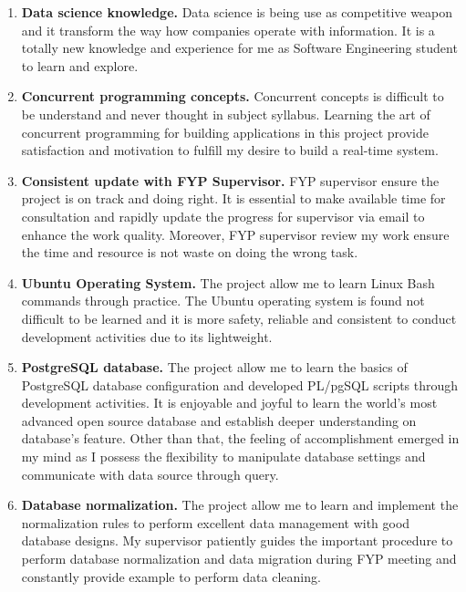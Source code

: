 \begin{enumerate}[topsep=0pt,itemsep=-1ex,partopsep=1ex,parsep=1.5ex]
	\item \textbf{Data science knowledge.} Data science is being use as competitive weapon and it transform the way how companies operate with information. It is a totally new knowledge and experience for me as Software Engineering student to learn and explore.
	
	\item \textbf{Concurrent programming concepts.} Concurrent concepts is difficult to be understand and never thought in subject syllabus. Learning the art of concurrent programming for building applications in this project provide satisfaction and motivation to fulfill my desire to build a real-time system. 
	
	\item \textbf{Consistent update with FYP Supervisor.} FYP supervisor ensure the project is on track and doing right. It is essential to make available time for consultation and rapidly update the progress for supervisor via email to enhance the work quality. Moreover, FYP supervisor review my work ensure the time and resource is not waste on doing the wrong task. 	 
	
	\item \textbf{Ubuntu Operating System.} The project allow me to learn Linux Bash commands through practice. The Ubuntu operating system is found not difficult to be learned and it is more safety, reliable and consistent to conduct development activities due to its lightweight.
	
	\item \textbf{PostgreSQL database.} The project allow me to learn the basics of PostgreSQL database configuration and developed PL/pgSQL scripts through development activities. It is enjoyable and joyful to learn the world's most advanced open source database and establish deeper understanding on database's feature. Other than that, the feeling of accomplishment emerged in my mind as I possess the flexibility to manipulate database settings and communicate with data source through query. 
	
	\item \textbf{Database normalization. } The project allow me to learn and implement the normalization rules to perform excellent data management with good database designs. My supervisor patiently guides the important procedure to perform database normalization and data migration during FYP meeting and constantly provide example to perform data cleaning. 
	
\end{enumerate}

